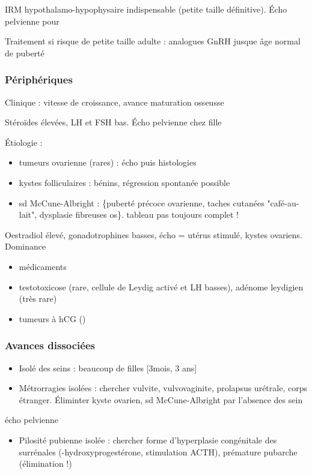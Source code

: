 \documentclass[11pt]{article}
\begin{document}
IRM hypothalamo-hypophysaire indispensable \danger (petite taille
définitive). Écho pelvienne pour \female

Traitement si risque de petite taille adulte : analogues GnRH jusque âge normal
de puberté
\subsubsection{Périphériques}
\label{sec:org74d5074}
Clinique : \inc vitesse de croissance, avance maturation osseusse

Stéroïdes élevées, LH et FSH bas. Écho pelvienne chez fille

Étiologie :
\begin{itemize}
\item tumeurs ovarienne (rares) : écho puis histologies
\item kystes folliculaires : bénins, régression spontanée possible
\item sd McCune-Albright : \{puberté précoce ovarienne, taches cutanées
"café-au-lait", dysplasie fibreuses os\}. \danger tableau pas toujours complet
!\\
\end{itemize}
Oestradiol élevé, gonadotrophines basses, écho = utérus stimulé, kystes
ovariens. Dominance \female
\begin{itemize}
\item médicaments
\item testotoxicose (rare, cellule de Leydig activé et LH basses), adénome leydigien
(très rare)
\item tumeurs à hCG (\male)
\end{itemize}
\subsubsection{Avances dissociées}
\label{sec:orgbf7930d}
\begin{itemize}
\item Isolé des seins : beaucoup de filles [3mois, 3 ans]
\item Métrorragies isolées : chercher vulvite, vulvovaginite, prolapsus urétrale,
corps étranger. Éliminter kyste ovarien, sd McCune-Albright par l'absence des
sein
\end{itemize}
\thus écho pelvienne
\begin{itemize}
\item Pilosité pubienne isolée : chercher forme d'hyperplasie congénitale des
surrénales (-hydroxyprogestérone, stimulation ACTH), prémature pubarche
(élimination !)
\end{itemize}
\end{document}

